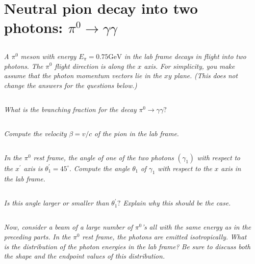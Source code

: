 \documentclass{article}
\begin{document}
\newpage

\section{Neutral pion decay into two photons: $\pi^{0} \rightarrow \gamma \gamma$}


\subsection{}
\textit{A $\pi^{0}$ meson with energy $E_{\pi}=0.75 \mathrm{GeV}$ in the lab frame decays in flight into two photons. The $\pi^{0}$ flight direction is along the $x$ axis. For simplicity, you make assume that the photon momentum vectors lie in the $x y$ plane. (This does not change the answers for the questions below.)}


\subsection{}
\textit{What is the branching fraction for the decay $\pi^{0} \rightarrow \gamma \gamma ?$}


\subsection{}
\textit{Compute the velocity $\beta=v / c$ of the pion in the lab frame.}


\subsection{}
\textit{In the $\pi^{0}$ rest frame, the angle of one of the two photons $\left(\gamma_{1}\right)$ with respect to the $x^{\prime}$ axis is $\theta_{1}^{\prime}=45^{\circ} .$ Compute the angle $\theta_{1}$ of $\gamma_{1}$ with respect to the $x$ axis in the lab frame.}


\subsection{}
\textit{Is this angle larger or smaller than $\theta_{1}^{\prime} ?$ Explain why this should be the case.}

\subsection{}
\textit{Now, consider a beam of a large number of $\pi^{0}$'s all with the same energy as in the preceding parts. In the $\pi^{0}$ rest frame, the photons are emitted isotropically. What is the distribution of the photon energies in the lab frame? Be sure to discuss both the shape and the endpoint values of this distribution.}
\end{document}
